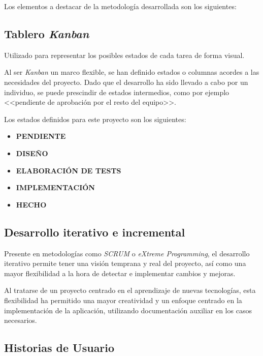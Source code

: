 \documentclass[10pt, a4paper]{aqademic}
\begin{document}
Los elementos a destacar de la metodología desarrollada son los siguientes:

\subsection*{Tablero \textit{Kanban}}

Utilizado para representar los posibles estados de cada tarea de forma visual.

\medskip

Al ser \textit{Kanban} un marco flexible, se han definido estados o columnas acordes a las necesidades del proyecto. Dado que el desarrollo ha sido llevado a cabo por un individuo, se puede prescindir de estados intermedios, como por ejemplo <<pendiente de aprobación por el resto del equipo>>.

\medskip

Los estados definidos para este proyecto son los siguientes:

\begin{itemize}
	\item \textbf{PENDIENTE}
	\item \textbf{DISEÑO}
	\item \textbf{ELABORACIÓN DE TESTS}
	\item \textbf{IMPLEMENTACIÓN}
	\item \textbf{HECHO}
\end{itemize}


\subsection*{Desarrollo iterativo e incremental}

Presente en metodologías como \textit{SCRUM} o \textit{eXtreme Programming}, el desarrollo iterativo permite tener una visión temprana y real del proyecto, así como una mayor flexibilidad a la hora de detectar e implementar cambios y mejoras.

\medskip

Al tratarse de un proyecto centrado en el aprendizaje de nuevas tecnologías, esta flexibilidad ha permitido una mayor creatividad y un enfoque centrado en la implementación de la aplicación, utilizando documentación auxiliar en los casos necesarios.


\subsection*{Historias de Usuario}
\end{document}

